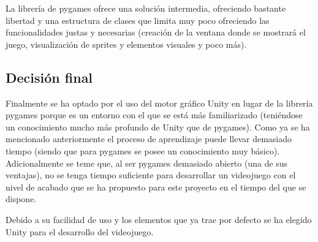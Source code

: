 La librería de pygames ofrece una solución intermedia, ofreciendo bastante libertad y una estructura de clases que limita muy poco ofreciendo las funcionalidades justas y necesarias (creación de la ventana donde se mostrará el juego, visualización de sprites y elementos visuales y poco más).

\subsection{Decisión final}
Finalmente se ha optado por el uso del motor gráfico Unity en lugar de la librería pygames porque es un entorno con el que se está más familiarizado (teniéndose un conocimiento mucho más profundo de Unity que de pygames). Como ya se ha mencionado anteriormente el proceso de aprendizaje puede llevar demasiado tiempo (siendo que para pygames se posee un conocimiento muy básico). Adicionalmente se teme que, al ser pygames demasiado abierto (una de sus ventajas), no se tenga tiempo suficiente para desarrollar un videojuego con el nivel de acabado que se ha propuesto para este proyecto en el tiempo del que se dispone.

Debido a su facilidad de uso y los elementos que ya trae por defecto se ha elegido Unity para el desarrollo del videojuego.

